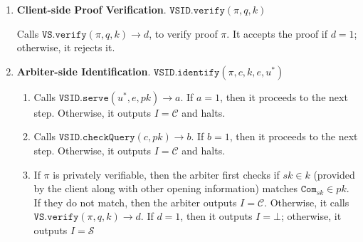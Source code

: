 \begin{enumerate}
\item\textbf{Client-side Proof Verification}. $\mathtt{VSID.verify}(\pi,q,k)$

Calls $\mathtt{VS.verify}(\pi,q,k)\rightarrow d$, to verify  proof $\pi$. It accepts the proof if $d=1$; otherwise, it rejects it. 




\item\textbf{Arbiter-side Identification}. $\mathtt{VSID.identify}(\pi,c,k,e,u^{\scriptscriptstyle *})$ 
\begin{enumerate}


\item\label{Arb-VSID.serve} Calls $\mathtt{VSID.serve}(u^{\scriptscriptstyle *},e,pk)\rightarrow a$. If $a=1$, then it proceeds to the next step. Otherwise, it outputs $I=\mathcal C$ and halts. 

\item Calls $\mathtt{VSID.checkQuery}(c, pk)\rightarrow b$. If $b=1$, then it proceeds to the next step. Otherwise, it outputs $I=\mathcal C$ and halts. 

\item  If $\pi$ is  privately verifiable, then the arbiter  first checks if $sk\in k$ (provided by the client along with other opening information) matches $\mathtt{Com}_{\scriptscriptstyle sk}\in pk$. If they do not match, then the arbiter outputs $I=\mathcal C$. Otherwise,  it calls $\mathtt{VS.verify}(\pi,q,k)\rightarrow d$. If $d=1$, then it outputs $I=\bot$; otherwise, it outputs $I=\mathcal S$
\end{enumerate}
\end{enumerate}

